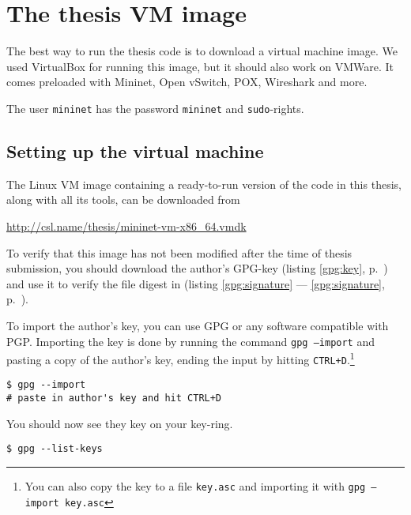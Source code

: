 \chapter{The thesis VM image}
\label{chapter:install.vm}

The best way to run the thesis code is to download a virtual machine image.
We used VirtualBox for running this image, but it should
also work on VMWare.  It comes preloaded with
Mininet, Open vSwitch,
  POX,
  Wireshark and more.

The user \texttt{mininet} has the password \texttt{mininet} and
\texttt{sudo}-rights.

\section{Setting up the virtual machine}

The Linux VM image containing a ready-to-run version of the
code in this thesis, along with all its tools, can be downloaded from

\begin{center}
  \url{http://csl.name/thesis/mininet-vm-x86_64.vmdk}
  \label{gpg:url}
\end{center}

To verify that this image has not been modified after the time of thesis
submission, you should download the author's GPG-key  (listing
\ref{gpg:key}, p.~\pageref{gpg:key}) and use it to verify the file digest
in (listing \vref{gpg:signature} --- \ref{gpg:signature}, p.~\pageref{gpg:signature}).

To import the author's key, you can use \ac{GPG} or any software compatible
with \ac{PGP}.  Importing the key is done by running the command
\texttt{gpg --import} and pasting a copy of the author's key, ending the
input by hitting \texttt{CTRL+D}.\footnote{You can also copy the key to a
  file \texttt{key.asc} and importing it with \texttt{gpg --import key.asc}}

\begin{lstlisting}
$ gpg --import
# paste in author's key and hit CTRL+D
\end{lstlisting}

You should now see they key on your key-ring.

\begin{lstlisting}
$ gpg --list-keys
\end{lstlisting}

